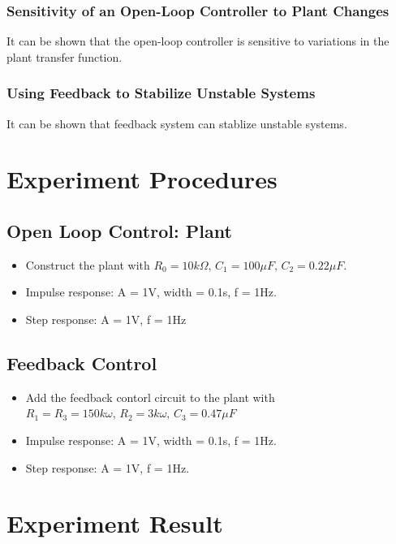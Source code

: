 \documentclass[a4paper]{article}
\begin{document}
            \subsubsection{Sensitivity of an Open-Loop Controller to Plant Changes}
            It can be shown that the open-loop controller is sensitive to variations in the plant transfer function.

            \subsubsection{Using Feedback to Stabilize Unstable Systems}
            It can be shown that feedback system can stablize unstable systems.


    \section{Experiment Procedures}
    \subsection{Open Loop Control: Plant}

    \begin{itemize}
        \item Construct the plant with $R_0 = 10k\Omega, \, C_1 = 100\mu F, \, C_2 = 0.22\mu F$.
        \item Impulse response: A = 1V, width = 0.1s, f = 1Hz.
        \item Step response: A = 1V, f = 1Hz
    \end{itemize} 
        \subsection{Feedback Control}

        \begin{itemize}
            \item Add the feedback contorl circuit to the plant with $R_1 = R_3 = 150k\omega, \, R_2 = 3k\omega, \, C_3 = 0.47\mu F$
            \item Impulse response: A = 1V, width = 0.1s, f = 1Hz.
            \item Step response: A = 1V, f = 1Hz.
        \end{itemize}


    \section{Experiment Result}
\end{document}
